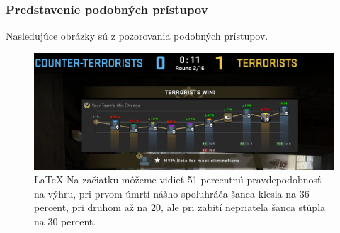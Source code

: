   \subsubsection{Predstavenie podobných prístupov}
  Nasledujúce obrázky sú z pozorovania podobných prístupov.
 \begin{figure}
 
 	\includegraphics[width=.9\textwidth]{figures/jednanula}
 	\centering
 	\caption{\LaTeX{} Na začiatku môžeme vidieť 51 percentnú pravdepodobnosť na výhru, pri prvom úmrtí nášho spoluhráča šanca klesla na 36 percent, pri druhom až na 20, ale pri zabití nepriateľa šanca stúpla na 30 percent.  \label{jednanula}}
 \end{figure}

